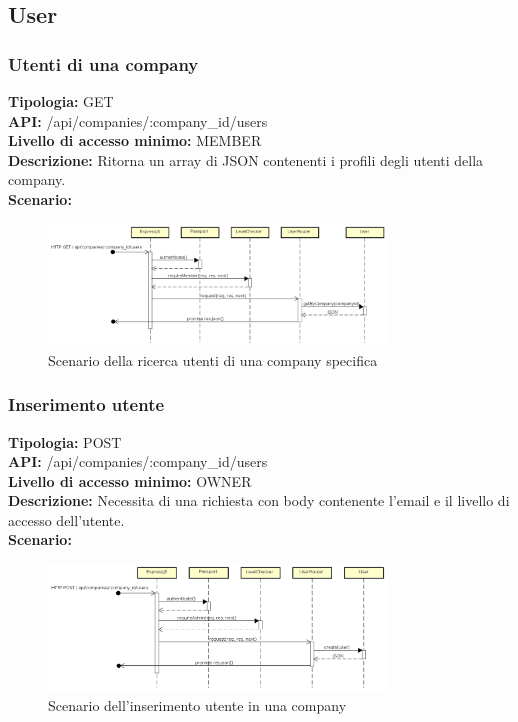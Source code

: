 \newpage
\subsection{User}
\subsubsection{Utenti di una company}
\textbf{Tipologia:} GET \\
\textbf{API:} /api/companies/:company\_id/users \\
\textbf{Livello di accesso minimo:} MEMBER \\
\textbf{Descrizione:} Ritorna un array di JSON contenenti i profili degli utenti della company. \\
\textbf{Scenario:} 
\begin{figure}[h]
\centering
\includegraphics[width=0.8\textwidth]{res/sections/backend/(GET)user.png}
\caption{Scenario della ricerca utenti di una company specifica}
\end{figure}

\newpage
\subsubsection{Inserimento utente}
\textbf{Tipologia:} POST \\
\textbf{API:} /api/companies/:company\_id/users \\
\textbf{Livello di accesso minimo:} OWNER \\
\textbf{Descrizione:} Necessita di una richiesta con body contenente l'email e il livello di accesso dell'utente.\\
\textbf{Scenario:} 
\begin{figure}[h]
\centering
\includegraphics[width=0.8\textwidth]{res/sections/backend/(POST)user.png}
\caption{Scenario dell'inserimento utente in una company}
\end{figure}

